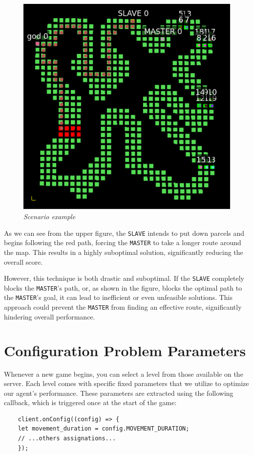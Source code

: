 \documentclass[12pt]{article}
\begin{document}
\begin{figure}[H]
    \centering
    \includegraphics[width=0.5\linewidth]{path_-1.png}
    \caption{\centering \textit{Scenario example}}
    \label{fig:enter-label}
\end{figure}

As we can see from the upper figure, the \texttt{SLAVE} intends to put down parcels and begins following the red path, forcing the \texttt{MASTER} to take a longer route around the map. This results in a highly suboptimal solution, significantly reducing the overall score.

However, this technique is both drastic and suboptimal. If the \texttt{SLAVE} completely blocks the \texttt{MASTER}'s path, or, as shown in the figure, blocks the optimal path to the \texttt{MASTER}'s goal, it can lead to inefficient or even unfeasible solutions. This approach could prevent the \texttt{MASTER} from finding an effective route, significantly hindering overall performance.


\section{Configuration Problem Parameters}

\label{config_params}

Whenever a new game begins, you can select a level from those available on the server. Each level comes with specific fixed parameters that we utilize to optimize our agent's performance. These parameters are extracted using the following callback, which is triggered once at the start of the game:

\begin{verbatim}
    client.onConfig((config) => {
    let movement_duration = config.MOVEMENT_DURATION;
    // ...others assignations...
    });
\end{verbatim}
\end{document}
